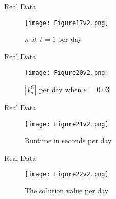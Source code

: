 \documentclass{beamer}
\begin{document}
\begin{frame}{Real Data}
    \begin{figure}
        \centering
        \texttt{[image: Figure17v2.png]}
        \caption{$n$ at $t=1$ per day}
    \end{figure}
\end{frame}


\begin{frame}{Real Data}
    \begin{figure}
        \centering
        \texttt{[image: Figure20v2.png]}
        \caption{$|V_a^C| $ per day when $\varepsilon=0.03$}
    \end{figure}
\end{frame}

\begin{frame}{Real Data}
    \begin{figure}
        \centering
        \texttt{[image: Figure21v2.png]}
        \caption{Runtime in seconds per day}
    \end{figure}
\end{frame}

\begin{frame}{Real Data}
    \begin{figure}
        \centering
        \texttt{[image: Figure22v2.png]}
        \caption{The solution value per day}
    \end{figure}
\end{frame}
\begin{comment} %
\begin{frame}{Real Data}{Experiment III}
    \begin{itemize}
        \item {We want to explore how the profit changes through out the 
        day.}
        \item {We mentioned that when we sample, the removed section is 
        usually empty.}
        \item {As such we expect the profit to increase.}
    \end{itemize}
    \begin{block}{Experiment III}
    We explore the profit as a function of $t$. The data was sampled on 
    28/08/2017.
    \end{block}
\end{frame}

\begin{frame}{Real Data}{Experiment III}
    \begin{figure}
        \centering
        \texttt{[image: Figure23v2.png]}
        \caption{Solution value as a function of $t$.}
    \end{figure}
\end{frame}
\end{comment}
\end{document}
